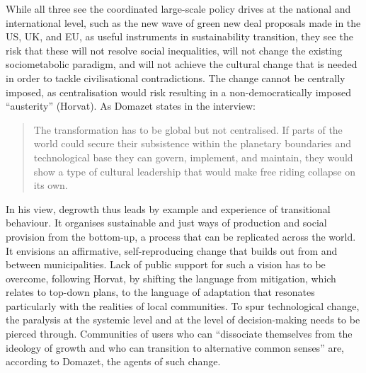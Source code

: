 \documentclass[a4paper, nobind]{templates/ociamthesis}
\begin{document}
While all three see the coordinated large-scale policy drives at the national and international level, such as the new wave of green new deal proposals made in the US, UK, and EU, as useful instruments in sustainability transition, they see the risk that these will not resolve social inequalities, will not change the existing sociometabolic paradigm, and will not achieve the cultural change that is needed in order to tackle civilisational contradictions. The change cannot be centrally imposed, as centralisation would risk resulting in a non-democratically imposed ``austerity'' (Horvat). As Domazet states in the interview:

\begin{quote}
The transformation has to be global but not centralised. If parts of the world could secure their subsistence within the planetary boundaries and technological base they can govern, implement, and maintain, they would show a type of cultural leadership that would make free riding collapse on its own.
\end{quote}

In his view, degrowth thus leads by example and experience of transitional behaviour. It organises sustainable and just ways of production and social provision from the bottom-up, a process that can be replicated across the world. It envisions an affirmative, self-reproducing change that builds out from and between municipalities. Lack of public support for such a vision has to be overcome, following Horvat, by shifting the language from mitigation, which relates to top-down plans, to the language of adaptation that resonates particularly with the realities of local communities. To spur technological change, the paralysis at the systemic level and at the level of decision-making needs to be pierced through. Communities of users who can ``dissociate themselves from the ideology of growth and who can transition to alternative common senses'' are, according to Domazet, the agents of such change.
\end{document}
